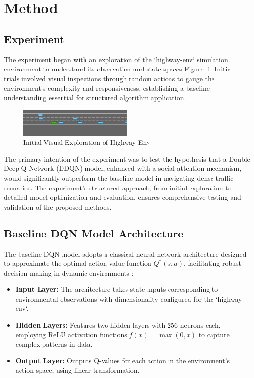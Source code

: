\documentclass{article}
\begin{document}
\section{Method}

\subsection{Experiment}
The experiment began with an exploration of the `highway-env` simulation environment to understand its observation and state spaces Figure~\ref{fig:initial_visual_inspection}. Initial trials involved visual inspections through random actions to gauge the environment's complexity and responsiveness, establishing a baseline understanding essential for structured algorithm application.

\begin{figure}[ht]
  \centering
  \includegraphics[width=0.5\textwidth]{./figures/highway_simulation_frame7.png}
  \caption{Initial Visual Exploration of Highway-Env}
  \label{fig:initial_visual_inspection}
\end{figure}

The primary intention of the experiment was to test the hypothesis that a Double Deep Q-Network (DDQN) model, enhanced with a social attention mechanism, would significantly outperform the baseline model in navigating dense traffic scenarios.
The experiment's structured approach, from initial exploration to detailed model optimization and evaluation, ensures comprehensive testing and validation of the proposed methods.

\subsection{Baseline DQN Model Architecture}
The baseline DQN model adopts a classical neural network architecture designed to approximate the optimal action-value function \( Q^*(s, a) \), facilitating robust decision-making in dynamic environments \citep{mnih2015humanlevel}:

\begin{itemize}
    \item \textbf{Input Layer:} The architecture takes state inputs corresponding to environmental observations with dimensionality configured for the `highway-env`.
    \item \textbf{Hidden Layers:} Features two hidden layers with 256 neurons each, employing ReLU activation functions \( f(x) = \max(0, x) \) to capture complex patterns in data.
    \item \textbf{Output Layer:} Outputs Q-values for each action in the environment's action space, using linear transformation.
\end{itemize}
\end{document}
